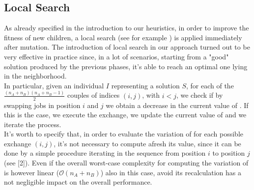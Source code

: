 \documentclass[opre,nonblindrev]{informs3} %
\begin{document}
\subsection{Local Search}
As already specified in the introduction to our heuristics, in order to improve the fitness of new children, a local search (see for example \cite{local}) is applied immediately after mutation. The introduction of local search in our approach turned out to be very effective in practice since, in a lot of scenarios, starting from a "good" solution produced by the previous phases, it's able to reach an optimal one lying in the neighborhood.\\
In particular, given an individual $I$ representing a solution $S$, for each of the $\frac{(n_A+n_B)(n_A+n_B-1)}{2}$ couples of indices $(i,j)$, with $i<j$,  we check if by swapping jobs in position $i$ and $j$ we obtain a decrease in the current value of . If this is the case, we execute the exchange, we update the current value of  and we iterate the process.\\
It's worth to specify that, in order to evaluate the variation of  for each possible exchange $(i,j)$, it's not necessary to compute afresh its value, since it can be done by a simple procedure iterating in the sequence from position $i$ to position $j$ (see [2]). Even if the overall worst-case complexity for computing the variation of  is however linear ($\mathcal{O}(n_A+n_B)$) also in this case, avoid its recalculation has a not negligible impact on the overall performance.
\end{document}
